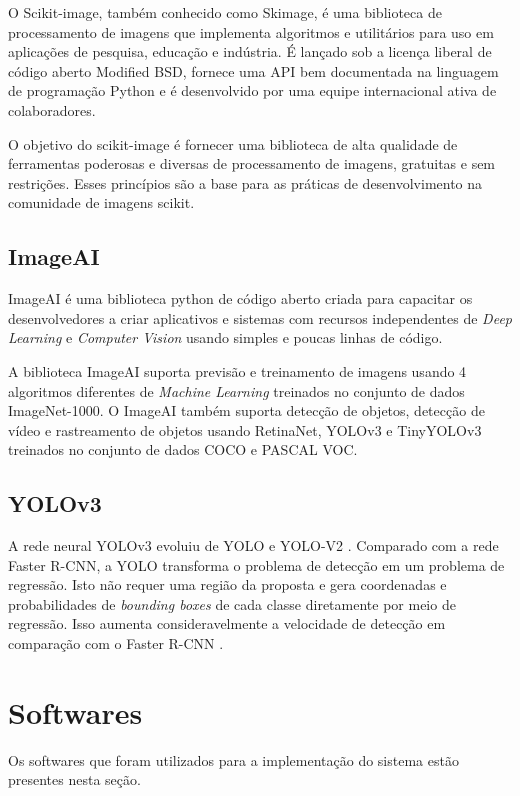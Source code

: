 O Scikit-image, também conhecido como Skimage, é uma biblioteca de processamento de imagens que implementa algoritmos e utilitários para uso em aplicações de pesquisa, educação e indústria. É lançado sob a licença liberal de código aberto Modified BSD, fornece uma API bem documentada na linguagem de programação Python e é desenvolvido por uma equipe internacional ativa de colaboradores.

O objetivo do scikit-image é fornecer uma biblioteca de alta qualidade de ferramentas poderosas e diversas de processamento de imagens, gratuitas e sem restrições. Esses princípios são a base para as práticas de desenvolvimento na comunidade de imagens scikit.\cite{skimage}

\subsection{ImageAI}

ImageAI é uma biblioteca python de código aberto criada para capacitar os desenvolvedores a criar aplicativos e sistemas com recursos independentes de \textit{Deep Learning} e \textit{Computer Vision} usando simples e poucas linhas de código.

A biblioteca ImageAI suporta previsão e treinamento de imagens usando 4 algoritmos diferentes de \textit{Machine Learning} treinados no conjunto de dados ImageNet-1000. O ImageAI também suporta detecção de objetos, detecção de vídeo e rastreamento de objetos usando RetinaNet, YOLOv3 e TinyYOLOv3 treinados no conjunto de dados COCO e PASCAL VOC.\cite{ImageAI}

\subsection{YOLOv3}

A rede neural YOLOv3 evoluiu de YOLO e YOLO-V2 \cite{redmon2018yolov3}. Comparado com a rede Faster R-CNN, a YOLO transforma o problema de detecção em um problema de regressão. Isto não requer uma região da proposta e gera coordenadas e probabilidades de \textit{bounding boxes} de cada classe diretamente por meio de regressão. Isso aumenta consideravelmente a velocidade de detecção em comparação com o Faster R-CNN .


\section{Softwares}
Os softwares que foram utilizados para a implementação do sistema estão presentes nesta seção.

